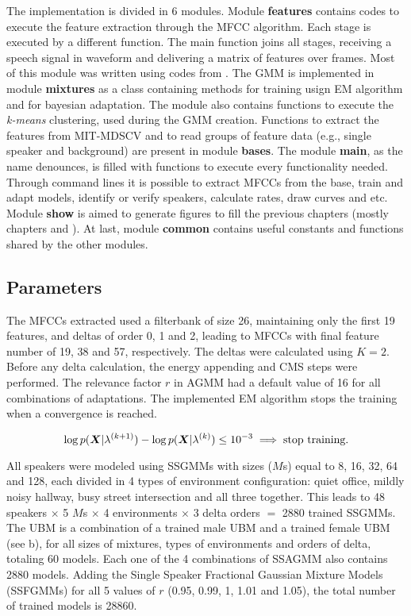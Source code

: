 The implementation is divided in 6 modules. Module \textbf{features} contains codes to execute the feature extraction through the MFCC algorithm. Each stage is executed by a different function. The main function joins all stages, receiving a speech signal in waveform and delivering a matrix of features over frames. Most of this module was written using codes from . The GMM is implemented in module \textbf{mixtures} as a class containing methods for training usign EM algorithm and for bayesian adaptation. The module also contains functions to execute the \emph{k-means} clustering, used during the GMM creation. Functions to extract the features from MIT-MDSCV and to read groups of feature data (e.g., single speaker and background) are present in module \textbf{bases}. The module \textbf{main}, as the name denounces, is filled with functions to execute every functionality needed. Through command lines it is possible to extract MFCCs from the base, train and adapt models, identify or verify speakers, calculate rates, draw curves and etc. Module \textbf{show} is aimed to generate figures to fill the previous chapters (mostly chapters  and ). At last, module \textbf{common} contains useful constants and functions shared by the other modules.

\subsection{Parameters}

The MFCCs extracted used a filterbank of size 26, maintaining only the first 19 features, and deltas of order 0, 1 and 2, leading to MFCCs with final feature number of 19, 38 and 57, respectively. The deltas were calculated using $K = 2$. Before any delta calculation, the energy appending and CMS steps were performed. The relevance factor $r$ in AGMM had a default value of 16 for all combinations of adaptations. The implemented EM algorithm stops the training when a convergence is reached.

\begin{equation}
    \log\postpdf{\dvec{X}}{\lambda^{(k+1)}} - \log\postpdf{\dvec{X}}{\lambda^{(k)}} \leq 10^{-3} \implies \text{stop training}.
    \label{eq:stop-condition}
\end{equation}

All speakers were modeled using SSGMMs with sizes ($M$s) equal to 8, 16, 32, 64 and 128, each divided in 4 types of environment configuration: quiet office, mildly noisy hallway, busy street intersection and all three together. This leads to 48 speakers $\times$ 5 $M$s $\times$ 4 environments $\times$ 3 delta orders $=$ 2880 trained SSGMMs. The UBM is a combination of a trained male UBM and a trained female UBM (see b), for all sizes of mixtures, types of environments and orders of delta, totaling 60 models. Each one of the 4 combinations of SSAGMM also contains 2880 models. Adding the Single Speaker Fractional Gaussian Mixture Models (SSFGMMs) for all 5 values of $r$ (0.95, 0.99, 1, 1.01 and 1.05), the total number of trained models is 28860.

